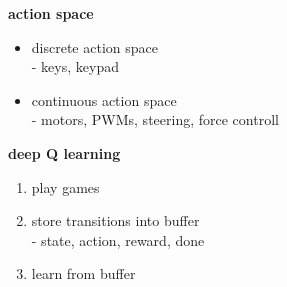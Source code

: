 \documentclass[xcolor=dvipsnames]{beamer}
\begin{document}
\begin{frame}{\bf action space}

  \begin{itemize}
    \item discrete action space \\
      - keys, keypad
    \item continuous action space \\
      - motors, PWMs, steering, force controll
  \end{itemize}


\end{frame}


\begin{frame}{\bf deep Q learning}


  \begin{enumerate}
    \item play games
    \item store transitions into buffer \\
      - state, action, reward, done
    \item learn from buffer
  \end{enumerate}
\end{frame}
\end{document}
